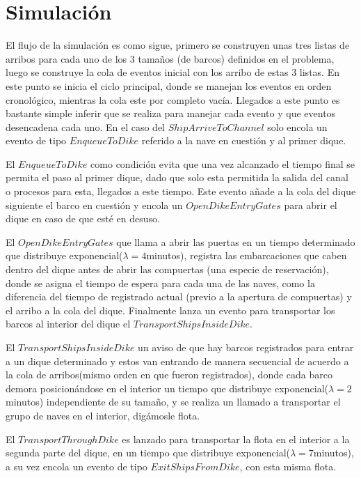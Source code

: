 \documentclass[a4paper,10pt,twocolumn]{article}
\begin{document}
\section{Simulación}
  El flujo de la simulaci\'on es como sigue, primero se construyen unas tres listas de arribos para cada uno de los 3 tamaños (de barcos) definidos en el problema, luego se construye la cola de eventos inicial con los arribo de estas 3 listas. En este punto se inicia el ciclo principal, donde se manejan los eventos en orden cronol\'ogico, mientras la cola este por completo vac\'ia. 
  Llegados a este punto es bastante simple inferir que se realiza para manejar cada evento y que eventos desencadena cada uno. En el caso del $ShipArriveToChannel$ solo encola un evento de tipo $EnqueueToDike$ referido a la nave en cuesti\'on y al primer dique. 
  
  El $EnqueueToDike$ como condici\'on evita que una vez alcanzado el tiempo final se permita el paso al primer dique, dado que solo esta permitida la salida del canal o procesos para esta, llegados a este tiempo. Este evento añade a la cola del dique siguiente el barco en cuesti\'on y encola un $OpenDikeEntryGates$ para abrir el dique en caso de que est\'e en desuso.
  
  El $OpenDikeEntryGates$ que llama a abrir las puertas en un tiempo determinado que distribuye exponencial($\lambda=4$minutos), registra las embarcaciones que caben dentro del dique antes de abrir las compuertas (una especie de reservaci\'on), donde se asigna el tiempo de espera para cada una de las naves, como la diferencia del tiempo de registrado actual (previo a la apertura de compuertas) y el arribo a la cola del dique. Finalmente lanza un evento para transportar los barcos al interior del dique el $TransportShipsInsideDike$.
  
  El $TransportShipsInsideDike$ un aviso de que hay barcos registrados para entrar a un dique determinado y estos van entrando de manera secuencial de acuerdo a la cola de arribos(mismo orden en que fueron registrados), donde cada barco demora posicion\'andose en el interior un tiempo que distribuye exponencial($\lambda=2$minutos) independiente de su tamaño, y se realiza un llamado a transportar el grupo de naves en el interior, dig\'amosle flota.
  
  El $TransportThroughDike$ es lanzado para transportar la flota en el interior a la segunda parte del dique, en un tiempo que distribuye exponencial($\lambda=7$minutos), a su vez encola un evento de tipo $ExitShipsFromDike$, con esta misma flota.
  
\end{document}
